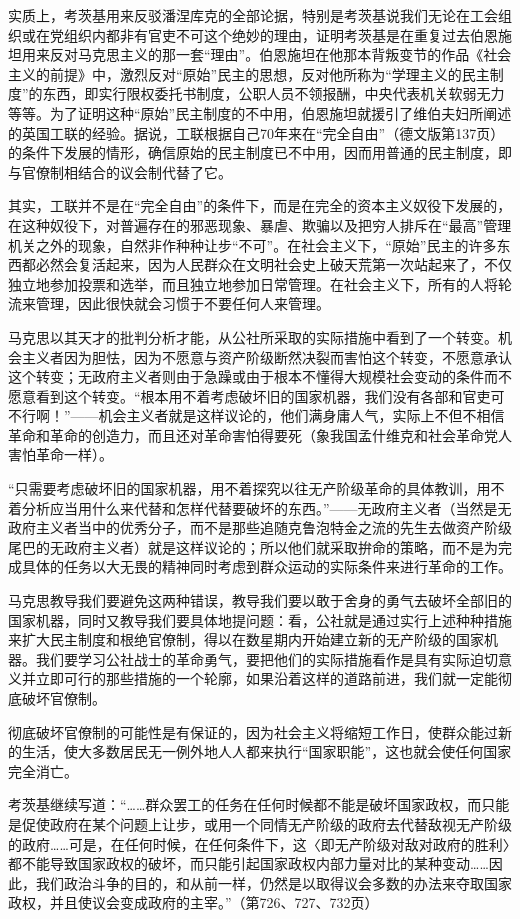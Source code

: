 \documentclass[UTF8, 12pt, a4paper]{ctexrep}
\begin{document}
实质上，考茨基用来反驳潘涅库克的全部论据，特别是考茨基说我们无论在工会组织或在党组织内都非有官吏不可这个绝妙的理由，证明考茨基是在重复过去伯恩施坦用来反对马克思主义的那一套“理由”。伯恩施坦在他那本背叛变节的作品《社会主义的前提》中，激烈反对“原始”民主的思想，反对他所称为“学理主义的民主制度”的东西，即实行限权委托书制度，公职人员不领报酬，中央代表机关软弱无力等等。为了证明这种“原始”民主制度的不中用，伯恩施坦就援引了维伯夫妇所阐述的英国工联的经验。据说，工联根据自己70年来在“完全自由”（德文版第137页）的条件下发展的情形，确信原始的民主制度已不中用，因而用普通的民主制度，即与官僚制相结合的议会制代替了它。

其实，工联并不是在“完全自由”的条件下，而是在完全的资本主义奴役下发展的，在这种奴役下，对普遍存在的邪恶现象、暴虐、欺骗以及把穷人排斥在“最高”管理机关之外的现象，自然非作种种让步“不可”。在社会主义下，“原始”民主的许多东西都必然会复活起来，因为人民群众在文明社会史上破天荒第一次站起来了，不仅独立地参加投票和选举，而且独立地参加日常管理。在社会主义下，所有的人将轮流来管理，因此很快就会习惯于不要任何人来管理。

马克思以其天才的批判分析才能，从公社所采取的实际措施中看到了一个转变。机会主义者因为胆怯，因为不愿意与资产阶级断然决裂而害怕这个转变，不愿意承认这个转变；无政府主义者则由于急躁或由于根本不懂得大规模社会变动的条件而不愿意看到这个转变。“根本用不着考虑破坏旧的国家机器，我们没有各部和官吏可不行啊！”——机会主义者就是这样议论的，他们满身庸人气，实际上不但不相信革命和革命的创造力，而且还对革命害怕得要死（象我国孟什维克和社会革命党人害怕革命一样）。

“只需要考虑破坏旧的国家机器，用不着探究以往无产阶级革命的具体教训，用不着分析应当用什么来代替和怎样代替要破坏的东西。”——无政府主义者（当然是无政府主义者当中的优秀分子，而不是那些追随克鲁泡特金之流的先生去做资产阶级尾巴的无政府主义者）就是这样议论的；所以他们就采取拚命的策略，而不是为完成具体的任务以大无畏的精神同时考虑到群众运动的实际条件来进行革命的工作。

马克思教导我们要避免这两种错误，教导我们要以敢于舍身的勇气去破坏全部旧的国家机器，同时又教导我们要具体地提问题：看，公社就是通过实行上述种种措施来扩大民主制度和根绝官僚制，得以在数星期内开始建立新的无产阶级的国家机器。我们要学习公社战士的革命勇气，要把他们的实际措施看作是具有实际迫切意义并立即可行的那些措施的一个轮廓，如果沿着这样的道路前进，我们就一定能彻底破坏官僚制。

彻底破坏官僚制的可能性是有保证的，因为社会主义将缩短工作日，使群众能过新的生活，使大多数居民无一例外地人人都来执行“国家职能”，这也就会使任何国家完全消亡。

考茨基继续写道：“……群众罢工的任务在任何时候都不能是破坏国家政权，而只能是促使政府在某个问题上让步，或用一个同情无产阶级的政府去代替敌视无产阶级的政府……可是，在任何时候，在任何条件下，这〈即无产阶级对敌对政府的胜利〉都不能导致国家政权的破坏，而只能引起国家政权内部力量对比的某种变动……因此，我们政治斗争的目的，和从前一样，仍然是以取得议会多数的办法来夺取国家政权，并且使议会变成政府的主宰。”（第726、727、732页）
\end{document}
